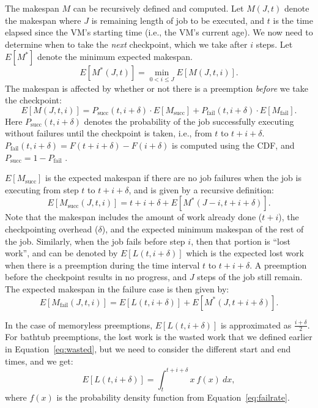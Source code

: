 The makespan $M$ can be recursively defined and computed.
Let $M(J, t)$ denote the makespan where $J$ is remaining length of job to be executed, and $t$ is the time elapsed since the  VM's starting time (i.e., the VM's current age). 
We now need to determine when to take the \emph{next} checkpoint, which we take after $i$ steps. Let $E[M^*]$ denote the minimum expected makespan.
\begin{equation}
  \label{eq:m0}
  E[M^*(J, t)] = \min_{0<i\leq J}{E[M(J, t, i)]}.
\end{equation}
The makespan is affected by whether or not there is a preemption \emph{before} we take the checkpoint: 
\begin{equation}
  \label{eq:m1}
E[M(J, t, i)] = P_{\text{succ}}(t, i+\delta) \cdot E[M_{\text{succ}}] + P_{\text{fail}}(t, i+\delta) \cdot E[M_{\text{fail}}].
\end{equation}
Here $P_{\text{succ}}(t, i+\delta)$ denotes the probability of the job successfully executing without failures until the checkpoint is taken, i.e., from $t$ to $t+i+\delta$. $P_{\text{fail}}(t, i+\delta) = F(t+i+\delta)-F(i+\delta)$ is computed using the CDF, 
and $P_{\text{succ}} = 1 - P_{\text{fail}}$ .


$E[M_{\text{succ}}]$ is the expected makespan if there are no job failures when the job is executing from step $t$ to $t+i+\delta$, and is given by a recursive definition:
\begin{equation}
  \label{eq:msuc}
E[M_{\text{succ}}(J, t, i)] = t+i+\delta + E[M^*(J-i, t+i+\delta)].  
\end{equation}
\noindent Note that the makespan includes the amount of work already done ($t+i$), the checkpointing overhead ($\delta$), and the expected minimum makespan of the rest of the job. 
Similarly, when the job fails before step $i$, then that portion is ``lost work'', and can be denoted by $E[L(t, i+\delta)]$ which is the expected lost work when there is a preemption during the time interval $t$ to $t+i+\delta$.
A preemption before the checkpoint results in no progress, and $J$ steps of the job still remain. 
The expected makespan in the failure case is then given by:
\begin{equation}
  \label{eq:mfail}
 E[M_{\text{fail}}(J, t, i)] = E[L(t, i+\delta)] + E[M^*(J, t+i+\delta)].
\end{equation}



In the case of memoryless preemptions, $E[L(t, i+\delta)]$ is approximated as $\frac{i+\delta}{2}$.
For bathtub preemptions, the lost work is the wasted work that we defined earlier in Equation~\ref{eq:wasted}, but we need to consider the different start and end times, and we get:
\begin{equation}
  \label{eq:exploss}
E[L(t, i+\delta)] = \int_{t}^{t+i+\delta}{x~f(x)~dx}   , 
\end{equation}
where $f(x)$ is the probability density function from Equation~\ref{eq:failrate}.

